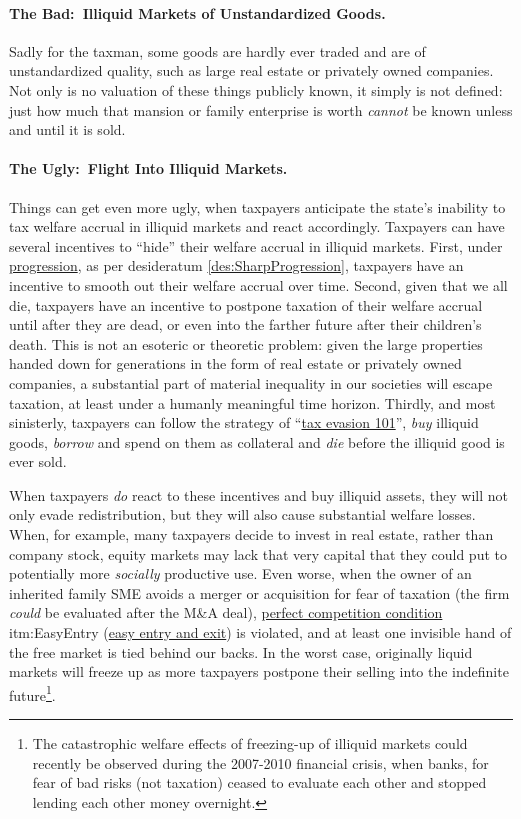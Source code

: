 \paragraph{The Bad:~Illiquid Markets of Unstandardized Goods.}
Sadly for the taxman, some goods are hardly ever traded and are of unstandardized quality, such as large real estate or privately owned companies.
Not only is no valuation of these things publicly known, it simply is not defined:
just how much that mansion or family enterprise is worth \emph{cannot} be known unless and until it is sold.

\paragraph{The Ugly:~Flight Into Illiquid Markets.}
	\label{sec:FreezingUp}
Things can get even more ugly, when taxpayers anticipate the state's inability to tax welfare accrual in illiquid markets and react accordingly.
Taxpayers can have several incentives to ``hide'' their welfare accrual in illiquid markets.
First, under \href{des:SharpProgression}{progression}, as per desideratum \ref{des:SharpProgression}, taxpayers have an incentive to smooth out their welfare accrual over time.
Second, given that we all die, taxpayers have an incentive to postpone taxation of their welfare accrual until after they are dead, or even into the farther future after their children's death.
This is not an esoteric or theoretic problem:
given the large properties handed down for generations in the form of real estate or privately owned companies, a substantial part of material inequality in our societies will escape taxation, at least under a humanly meaningful time horizon.
Thirdly, and most sinisterly, taxpayers can follow the strategy of ``\href{sec:Evasion101}{tax evasion 101}'', \emph{buy} illiquid goods, \emph{borrow} and spend on them as collateral and \emph{die} before the illiquid good is ever sold.

When taxpayers \emph{do} react to these incentives and buy illiquid assets, they will not only evade redistribution, but they will also cause substantial welfare losses.
When, for example, many taxpayers decide to invest in real estate, rather than company stock, equity markets may lack that very capital that they could put to potentially more \emph{socially} productive use.
Even worse, when the owner of an inherited family SME avoids a merger or acquisition for fear of taxation (the firm \emph{could} be evaluated after the M\&A deal), \href{sec:PerfectCompetition}{perfect competition condition} {itm:EasyEntry} (\hyperref[itm:EasyEntry]{easy entry and exit}) is violated, and at least one invisible hand of the free market is tied behind our backs.
In the worst case, originally liquid markets will freeze up as more taxpayers postpone their selling into the indefinite future\footnote{The catastrophic welfare effects of freezing-up of illiquid markets could recently be observed during the 2007-2010 financial crisis, when banks, for fear of bad risks (not taxation) ceased to evaluate each other and stopped lending each other money overnight.}.

